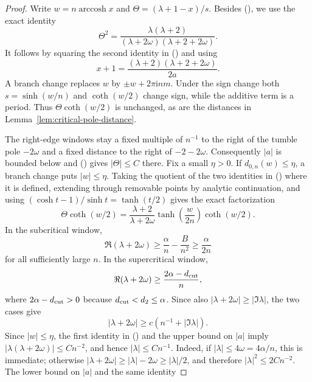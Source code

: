 \documentclass[twoside,10pt]{article}
\numberwithin{equation}{section}
\theoremstyle{slbody}
\theoremstyle{definition}
\theoremstyle{remark}
\renewcommand{\eqref}[1]{%
  \textup{{\normalfont(\oldstylenums{\ref{#1}}}\normalfont)}}
\begin{document}
\begin{proof}
Write $w=n\operatorname{arccosh}x$ and
$\Theta=(\lambda+1-x)/s$.  Besides
\eqref{eq:finite-green-z}, we use the exact identity
\begin{equation}\label{eq:critical-theta-square}
 \Theta^2=
 \frac{\lambda(\lambda+2)}
 { (\lambda+2\omega)(\lambda+2+2\omega)}.
\end{equation}
It follows by squaring the second identity in
\eqref{eq:fixed-exact-x-identities} and using
\[
 x+1=\frac{(\lambda+2)(\lambda+2+2\omega)}{2a}.
\]
A branch change replaces $w$ by
$\pm w+2\pi\mathrm i n m$.  Under the sign change both
$s=\sinh(w/n)$ and $\coth(w/2)$ change sign, while the additive term is
a period.  Thus $\Theta\coth(w/2)$ is unchanged, as are the distances
in Lemma~\ref{lem:critical-pole-distance}.

The right-edge windows stay a fixed multiple of $n^{-1}$ to the right
of the tumble pole $-2\omega$ and a fixed distance to the right of
$-2-2\omega$.  Consequently $|a|$ is bounded below and
\eqref{eq:critical-theta-square} gives $|\Theta|\le C$ there.  Fix a
small $\eta>0$.  If $d_{0,n}(w)\le\eta$, a branch change puts
$|w|\le\eta$.  Taking the quotient of the two identities in
\eqref{eq:fixed-exact-x-identities} where it is defined, extending
through removable points by analytic continuation, and using
$(\cosh t-1)/\sinh t=\tanh(t/2)$ gives the exact factorization
\begin{equation}\label{eq:critical-zero-exact-factorization}
 \Theta\coth(w/2)
 =\frac{\lambda+2}{\lambda+2\omega}
   \tanh\!\left(\frac{w}{2n}\right)\coth(w/2).
\end{equation}
In the subcritical window,
\[
 \Re(\lambda+2\omega)
 \ge \frac{\alpha}{n}-\frac{B}{n^2}
 \ge \frac{\alpha}{2n}
\]
for all sufficiently large $n$.  In the supercritical window,
\[
 \Re(\lambda+2\omega)\ge\frac{2\alpha-d_{\rm cut}}{n},
\]
where $2\alpha-d_{\rm cut}>0$ because
$d_{\rm cut}<d_2\le\alpha$.  Since also
$|\lambda+2\omega|\ge|\Im\lambda|$, the two cases give
\begin{equation}\label{eq:critical-tumble-distance}
 |\lambda+2\omega|\ge c(n^{-1}+|\Im\lambda|).
\end{equation}
Since $|w|\le\eta$,
the first identity in \eqref{eq:fixed-exact-x-identities} and the upper
bound on $|a|$ imply
$|\lambda(\lambda+2\omega)|\le Cn^{-2}$, and hence
$|\lambda|\le Cn^{-1}$.  Indeed, if
$|\lambda|\le4\omega=4\alpha/n$, this is immediate; otherwise
$|\lambda+2\omega|\ge|\lambda|-2\omega\ge|\lambda|/2$, and therefore
$|\lambda|^2\le2Cn^{-2}$.  The lower bound on $|a|$ and the same identity

\end{proof}
\end{document}
